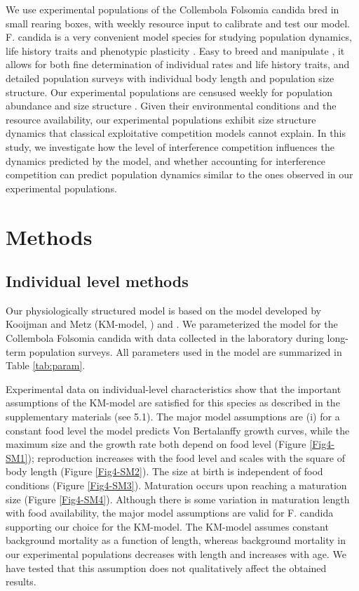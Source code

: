 We use experimental populations of the Collembola Folsomia candida bred in small
rearing boxes, with weekly resource input \autocites{tully2008a} to calibrate and
test our model. F. candida is a very convenient model species for studying
population dynamics, life history traits and phenotypic plasticity
\autocites{tully2005a,tully2008a}. Easy to breed and manipulate
\autocites{fountain2005a}, it allows for both fine determination of individual
rates and life history traits, and detailed population surveys with individual
body length and population size structure. Our experimental populations are
censused weekly for population abundance and size structure
\autocites{mallard2012a,mallard2013a}. Given their environmental conditions and
the resource availability, our experimental populations exhibit size structure
dynamics that classical exploitative competition models cannot explain. In this
study, we investigate how the level of interference competition influences the
dynamics predicted by the model, and whether accounting for interference
competition can predict population dynamics similar to the ones observed in our
experimental populations.



\section{Methods}

\subsection{Individual level methods}

Our physiologically structured model is based on the model developed by Kooijman
and Metz (KM-model, \citeyear{kooijman1984a}) and \textcite{de-roos1992a}. We
parameterized the model for the Collembola Folsomia candida with data collected
in the laboratory during long-term population surveys. All parameters used in
the model are summarized in Table \ref{tab:param}.

Experimental data on individual-level characteristics show that the important
assumptions of the KM-model are satisfied for this species as described in the
supplementary materials (see 5.1). The major model assumptions are (i) for a
constant food level the model predicts Von Bertalanffy growth curves, while the
maximum size and the growth rate both depend on food level (Figure
\ref{Fig4-SM1}); reproduction increases with the food level and scales with the
square of body length (Figure \ref{Fig4-SM2}). The size at birth is independent
of food conditions (Figure \ref{Fig4-SM3}). Maturation occurs upon reaching a
maturation size (Figure \ref{Fig4-SM4}). Although there is some variation in maturation
length with food availability, the major model assumptions are valid for F.
candida supporting our choice for the KM-model. The KM-model assumes constant
background mortality as a function of length, whereas background mortality in
our experimental populations decreases with length and increases with age. We
have tested that this assumption does not qualitatively affect the obtained
results.

